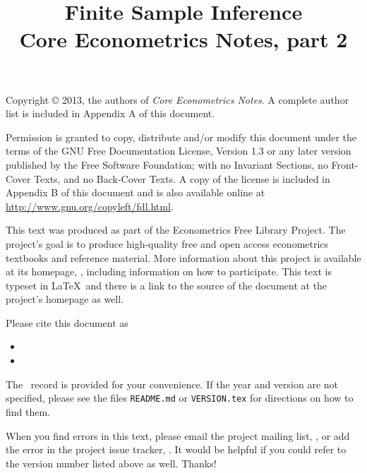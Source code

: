 \documentclass[nohyper]{tufte-handout}
\title[Finite Sample Inference]%
{Finite Sample Inference \\
  Core Econometrics Notes, part 2}
\begin{document}
\maketitle

\bigskip\noindent%
Copyright © 2013, the authors of \textit{Core Econometrics Notes}.
A complete author list is included in Appendix A of this document.

Permission is granted to copy, distribute and/or modify this document
under the terms of the GNU Free Documentation License, Version 1.3 or
any later version published by the Free Software Foundation; with no
Invariant Sections, no Front-Cover Texts, and no Back-Cover Texts.  A
copy of the license is included in Appendix B of this document and is
also available online at \url{http://www.gnu.org/copyleft/fdl.html}.

This text was produced as part of the Econometrics Free Library
Project.  The project's goal is to produce high-quality free and
open access econometrics textbooks and reference material.  More
information about this project is available at its homepage,
\homepage, including information on how
to participate.  This text is typeset in \LaTeX\ and there is a link
to the source of the document at the project's homepage as well.

Please cite this document as
\begin{itemize}
\item[] 
\item[] 
\end{itemize}
The \BibTeX\ record is provided for your convenience.
If the year and version are not specified, please see the files
\texttt{README.md} or \texttt{VERSION.tex} for directions on how to
find them.

When you find errors in this text, please email the project mailing
list, \maillist, or add the error in the project issue tracker,
\bugtrack.  It would be helpful if you could refer to the version
number listed above as well.  Thanks!

\tableofcontents















\end{document}
